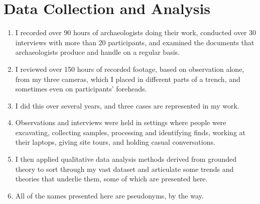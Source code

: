 \documentclass{article}
\begin{document}
\section{Data Collection and Analysis}
\begin{enumerate}
  \item I recorded over 90 hours of archaeologists doing their work, conducted over 30 interviews with more than 20 participants, and examined the documents that archaeologists produce and handle on a regular basis.
  \item I reviewed over 150 hours of recorded footage, based on observation alone, from my three cameras, which I placed in different parts of a trench, and sometimes even on participants' foreheads.
  \item I did this over several years, and three cases are represented in my work.
  \item Observations and interviews were held in settings where people were excavating, collecting samples, processing and identifying finds, working at their laptops, giving site tours, and holding casual conversations.
  \item I then applied qualitative data analysis methods derived from grounded theory to sort through my vast dataset and articulate some trends and theories that underlie them, some of which are presented here.
  \item All of the names presented here are pseudonyms, by the way.
\end{enumerate}
\end{document}
